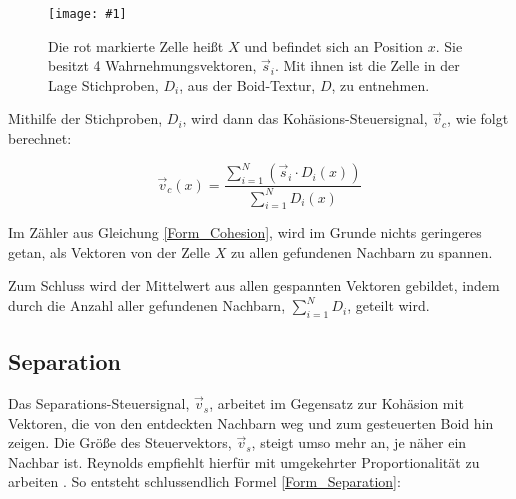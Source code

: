 \documentclass[a4paper, 10pt, journal]{wissarbIEEE}      %
\newcommand{\bild}[3]{
\begin{figure}[h]
\centering
  \texttt{[image: \#1]}
  \caption{#3}
  \label{#1}
\end{figure}}
\begin{document}
\bild{bilder/ChesionAbb}{3cm}{Die rot markierte Zelle heißt $X$ und befindet sich an Position $x$. Sie besitzt 4 Wahrnehmungsvektoren, $\vec{s}_i$. Mit ihnen ist die Zelle in der Lage Stichproben, $D_i$, aus der Boid-Textur, $D$, zu entnehmen.}

Mithilfe der Stichproben, $D_i$, wird dann das Kohäsions-Steuersignal, $\vec{v}_c$, wie folgt berechnet:

\begin{equation}
\vec{v}_c(x) = \frac{\sum_{i=1}^N( \vec{s}_i \cdot D_i(x))}{\sum_{i=1}^N D_i(x)}
\label{Form_Cohesion}
\end{equation}

Im Zähler aus Gleichung \ref{Form_Cohesion}, wird im Grunde nichts geringeres getan, als Vektoren von der Zelle $X$ zu allen gefundenen Nachbarn zu spannen.


Zum Schluss wird der Mittelwert aus allen gespannten Vektoren gebildet, indem durch die Anzahl aller gefundenen Nachbarn, $\sum_{i=1}^N D_i$, geteilt wird. 



\subsection{Separation}


Das Separations-Steuersignal, $\vec{v}_s$, arbeitet im Gegensatz zur Kohäsion mit Vektoren, die von den entdeckten Nachbarn weg und zum gesteuerten Boid hin zeigen. Die Größe des Steuervektors, $\vec{v}_s$, steigt umso mehr an, je näher ein Nachbar ist. Reynolds empfiehlt hierfür mit umgekehrter Proportionalität zu arbeiten \cite{Reynolds99steeringbehaviors}.
So entsteht schlussendlich Formel \ref{Form_Separation}:
\end{document}
